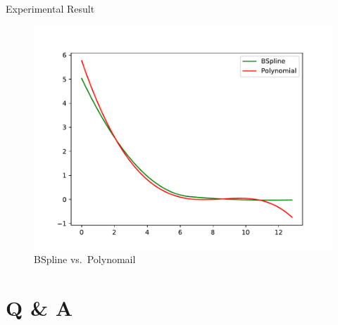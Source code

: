 \documentclass[10pt,ignorenonframetext,serif,onlymath]{beamer}
\begin{document}
\begin{frame}{Experimental Result}
\protect\hypertarget{experimental-result}{}

\begin{figure}
\centering
\includegraphics{ellipsoid.files/corr_fn.pdf}
\caption{BSpline vs.~Polynomail}
\end{figure}

\end{frame}

\hypertarget{q-a}{%
\section{Q \& A}\label{q-a}}
\end{document}
